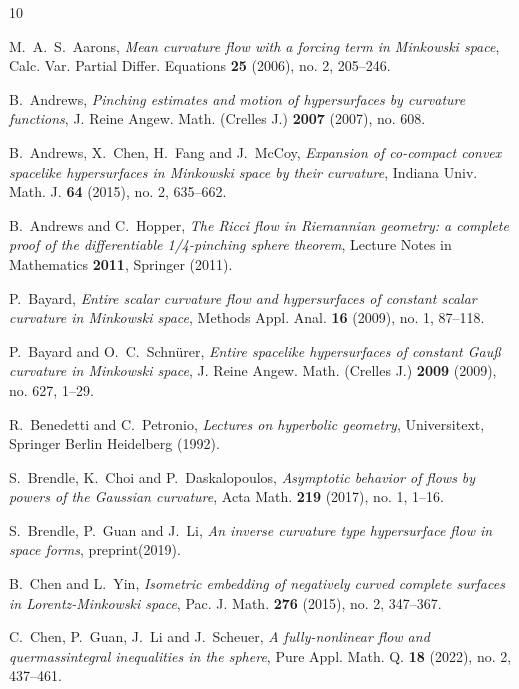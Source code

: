 \documentclass[reqno]{amsart}
\theoremstyle{remark}
\theoremstyle{definition}
\numberwithin{equation}{section}
\begin{document}
\begin{thebibliography}{10}


 M.~A.~S.~Aarons, {\em Mean curvature flow with a forcing term in Minkowski space}, Calc. Var. Partial Differ. Equations {\bf 25} (2006), no. 2, 205--246.

 B.~Andrews, {\em Pinching estimates and motion of hypersurfaces by curvature functions}, J. Reine Angew. Math. (Crelles J.) {\bf 2007} (2007), no. 608.

 B.~Andrews, X.~Chen, H.~Fang and J.~McCoy, {\em Expansion of co-compact convex spacelike hypersurfaces in Minkowski space by their curvature}, Indiana Univ. Math. J. {\bf 64} (2015), no. 2, 635--662.

 B.~Andrews and C.~Hopper, {\em The Ricci flow in Riemannian geometry: a complete proof of the differentiable 1/4-pinching sphere theorem}, Lecture Notes in Mathematics {\bf 2011}, Springer (2011).


 P.~Bayard, {\em Entire scalar curvature flow and hypersurfaces of constant scalar curvature in Minkowski space}, Methods Appl. Anal. {\bf 16} (2009), no. 1, 87--118.

 P.~Bayard and O.~C.~Schn\"{u}rer, {\em Entire spacelike hypersurfaces of constant Gau{\ss} curvature in Minkowski space}, J. Reine Angew. Math. (Crelles J.) {\bf 2009} (2009), no. 627, 1--29.

 R.~Benedetti and C.~Petronio, {\em Lectures on hyperbolic geometry}, Universitext, Springer Berlin Heidelberg (1992).

 S.~Brendle, K.~Choi and P.~Daskalopoulos, {\em Asymptotic behavior of flows by powers of the Gaussian curvature}, Acta Math. {\bf 219} (2017), no. 1, 1--16.

 S.~Brendle, P.~Guan and J.~Li, {\em An inverse curvature type hypersurface flow in space forms}, preprint(2019).

 B.~Chen and L.~Yin, {\em Isometric embedding of negatively curved complete surfaces in Lorentz-Minkowski space}, Pac. J. Math. {\bf 276} (2015), no. 2, 347--367.

 C.~Chen, P.~Guan, J.~Li and J.~Scheuer, {\em A fully-nonlinear flow and quermassintegral inequalities in the sphere}, Pure Appl. Math. Q. {\bf 18} (2022), no. 2, 437--461.


\end{thebibliography}
\end{document}
